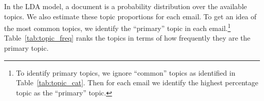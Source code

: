 \documentclass[12pt]{article}
\theoremstyle{definition}
\theoremstyle{algodesc}
\begin{document}





In the LDA model, a document is a probability distribution over the available topics. We also estimate these topic proportions for each email. To get an idea of the most common topics, we identify the ``primary'' topic in each email.\footnote{To identify primary topics, we ignore ``common'' topics as identified in Table~\ref{tab:topic_cat}. Then for each email we identify the highest percentage topic as the ``primary'' topic.} Table~\ref{tab:topic_freq} ranks the topics in terms of how frequently they are the primary topic.
\end{document}
